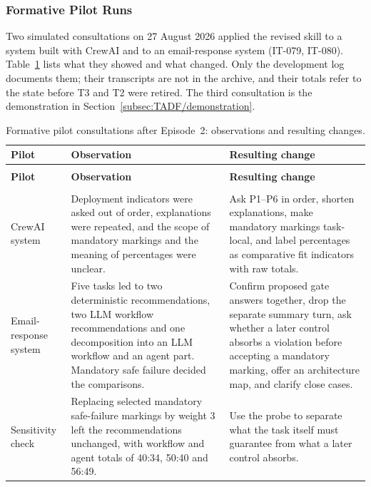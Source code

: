 \subsubsection{Formative Pilot Runs}
\label{app:eval2/pilots}
Two simulated consultations on 27 August 2026 applied the revised skill to a system built with CrewAI and to an email-response system (IT-079, IT-080). Table~\ref{tab:eval-pilots} lists what they showed and what changed. Only the development log documents them; their transcripts are not in the archive, and their totals refer to the state before T3 and T2 were retired. The third consultation is the demonstration in Section~\ref{subsec:TADF/demonstration}.

\begingroup
\renewcommand{\baselinestretch}{1}
\small
\setlength{\tabcolsep}{4pt}
\renewcommand{\arraystretch}{1.08}
\begin{longtable}{>{\raggedright\arraybackslash}p{} >{\raggedright\arraybackslash}p{} >{\raggedright\arraybackslash}p{}}
\caption{Formative pilot consultations after Episode~2: observations and resulting changes.}\label{tab:eval-pilots} \\
\toprule
\textbf{Pilot} & \textbf{Observation} & \textbf{Resulting change} \\
\midrule
\endfirsthead
\multicolumn{3}{l}{\tablename~\thetable{} (continued)} \\
\toprule
\textbf{Pilot} & \textbf{Observation} & \textbf{Resulting change} \\
\midrule
\endhead
\midrule
\multicolumn{3}{r}{\emph{Continued on the next page.}} \\
\endfoot
\bottomrule
\endlastfoot
CrewAI system & Deployment indicators were asked out of order, explanations were repeated, and the scope of mandatory markings and the meaning of percentages were unclear. & Ask P1--P6 in order, shorten explanations, make mandatory markings task-local, and label percentages as comparative fit indicators with raw totals. \\
\addlinespace[2.5pt]
Email-response system & Five tasks led to two deterministic recommendations, two LLM workflow recommendations and one decomposition into an LLM workflow and an agent part. Mandatory safe failure decided the comparisons. & Confirm proposed gate answers together, drop the separate summary turn, ask whether a later control absorbs a violation before accepting a mandatory marking, offer an architecture map, and clarify close cases. \\
\addlinespace[2.5pt]
Sensitivity check & Replacing selected mandatory safe-failure markings by weight 3 left the recommendations unchanged, with workflow and agent totals of 40:34, 50:40 and 56:49. & Use the probe to separate what the task itself must guarantee from what a later control absorbs. \\
\end{longtable}
\endgroup

